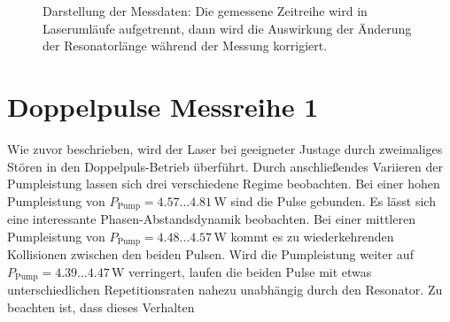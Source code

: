 \documentclass[bachelor,       %
               twoside,        %
               BCOR10mm,       %
               liststotoc,nomtotoc,bibtotoc, %
               english,ngerman, %
               final,          %
               ]{GAUBM}
\begin{document}
\begin{figure}[!htb]
   \hfill
   \caption{Darstellung der Messdaten: Die gemessene Zeitreihe wird in Laserumläufe aufgetrennt, dann wird die Auswirkung der Änderung der Resonatorlänge während der Messung korrigiert.}
   \label{fig:MessdatenDarstellung}
\end{figure}

\section{Doppelpulse Messreihe 1}
Wie zuvor beschrieben, wird der Laser bei geeigneter Justage durch zweimaliges Stören in den Doppelpuls-Betrieb überführt.
Durch anschließendes Variieren der Pumpleistung lassen sich drei verschiedene Regime beobachten.
Bei einer hohen Pumpleistung von $P_\text{Pump}=4.57\dots 4.81\,$W sind die Pulse gebunden.
Es lässt sich eine interessante Phasen-Abstandsdynamik beobachten.
Bei einer mittleren Pumpleistung von $P_\text{Pump}=4.48\dots 4.57\,$W kommt es zu wiederkehrenden Kollisionen zwischen den beiden Pulsen.
Wird die Pumpleistung weiter auf $P_\text{Pump}=4.39\dots 4.47\,$W verringert, laufen die beiden Pulse mit etwas unterschiedlichen Repetitionsraten nahezu unabhängig durch den Resonator.
Zu beachten ist, dass dieses Verhalten 
\clearpage
\end{document}
